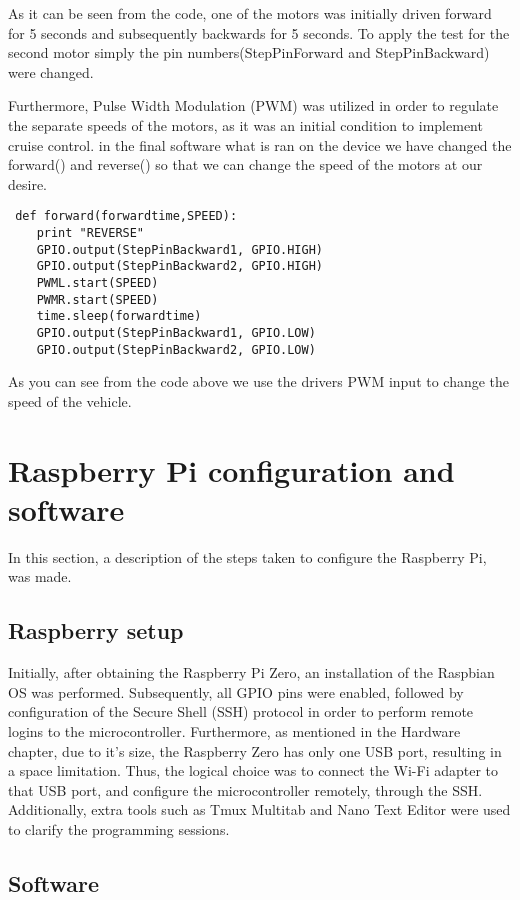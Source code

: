 As it can be seen from the code, one of the motors was initially driven forward for 5 seconds and subsequently backwards for 5 seconds. To apply the test for the second motor simply the pin numbers(StepPinForward and StepPinBackward) were changed.

Furthermore, Pulse Width Modulation (PWM) was utilized in order to regulate the separate speeds of the motors, as it was an initial condition to implement cruise control.
in the final software what is ran on the device we have changed the forward() and reverse() so that we can change the speed of the motors at our desire.

\begin{lstlisting}
 def forward(forwardtime,SPEED):
	print "REVERSE"
	GPIO.output(StepPinBackward1, GPIO.HIGH)
	GPIO.output(StepPinBackward2, GPIO.HIGH)
	PWML.start(SPEED)
	PWMR.start(SPEED)
	time.sleep(forwardtime)
	GPIO.output(StepPinBackward1, GPIO.LOW)
	GPIO.output(StepPinBackward2, GPIO.LOW)
\end{lstlisting}

As you can see from the code above we use the drivers PWM input to change the speed of the vehicle.

\section{Raspberry Pi configuration and software}

In this section, a description of the steps taken to configure the Raspberry Pi, was made.

\subsection{Raspberry setup}

Initially, after obtaining the Raspberry Pi Zero, an installation of the Raspbian OS was performed.
Subsequently, all GPIO pins were enabled, followed by configuration of the Secure Shell (SSH) protocol in order to perform remote logins to the microcontroller. Furthermore, as mentioned in the Hardware chapter, due to it's size, the Raspberry Zero has only one USB port, resulting in a space limitation. Thus, the logical choice was to connect the Wi-Fi adapter to that USB port, and configure the microcontroller remotely, through the SSH. 
Additionally, extra tools such as Tmux Multitab and Nano Text Editor were used to clarify the programming sessions.

\subsection{Software}

